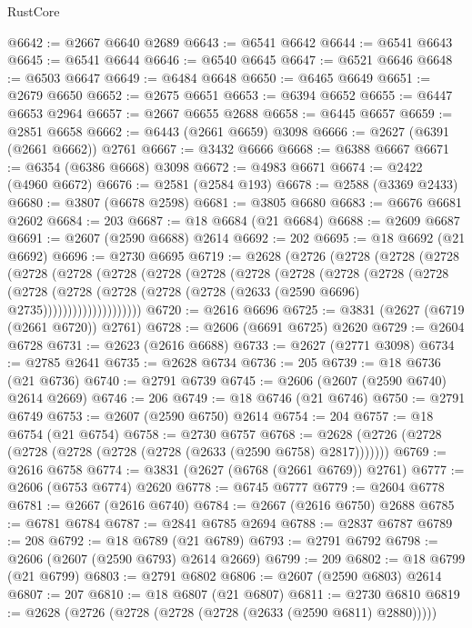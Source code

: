 \begin{lexlean}{RustCore}
\begin{coremodule}
@6642 := @2667 @6640 @2689
@6643 := @6541 @6642
@6644 := @6541 @6643
@6645 := @6541 @6644
@6646 := @6540 @6645
@6647 := @6521 @6646
@6648 := @6503 @6647
@6649 := @6484 @6648
@6650 := @6465 @6649
@6651 := @2679 @6650
@6652 := @2675 @6651
@6653 := @6394 @6652
@6655 := @6447 @6653 @2964
@6657 := @2667 @6655 @2688
@6658 := @6445 @6657
@6659 := @2851 @6658
@6662 := @6443 (@2661 @6659) @3098
@6666 := @2627 (@6391 (@2661 @6662)) @2761
@6667 := @3432 @6666
@6668 := @6388 @6667
@6671 := @6354 (@6386 @6668) @3098
@6672 := @4983 @6671
@6674 := @2422 (@4960 @6672)
@6676 := @2581 (@2584 @193)
@6678 := @2588 (@3369 @2433)
@6680 := @3807 (@6678 @2598)
@6681 := @3805 @6680
@6683 := @6676 @6681 @2602
@6684 := 203
@6687 := @18 @6684 (@21 @6684)
@6688 := @2609 @6687
@6691 := @2607 (@2590 @6688) @2614
@6692 := 202
@6695 := @18 @6692 (@21 @6692)
@6696 := @2730 @6695
@6719 := @2628
    (@2726
      (@2728
        (@2728
          (@2728
            (@2728
              (@2728
                (@2728
                  (@2728
                    (@2728
                      (@2728
                        (@2728
                          (@2728
                            (@2728
                              (@2728
                                (@2728
                                  (@2728
                                    (@2728
                                      (@2728 (@2728 (@2633 (@2590 @6696) @2735))))))))))))))))))))
@6720 := @2616 @6696
@6725 := @3831 (@2627 (@6719 (@2661 @6720)) @2761)
@6728 := @2606 (@6691 @6725) @2620
@6729 := @2604 @6728
@6731 := @2623 (@2616 @6688)
@6733 := @2627 (@2771 @3098)
@6734 := @2785 @2641
@6735 := @2628 @6734
@6736 := 205
@6739 := @18 @6736 (@21 @6736)
@6740 := @2791 @6739
@6745 := @2606 (@2607 (@2590 @6740) @2614 @2669)
@6746 := 206
@6749 := @18 @6746 (@21 @6746)
@6750 := @2791 @6749
@6753 := @2607 (@2590 @6750) @2614
@6754 := 204
@6757 := @18 @6754 (@21 @6754)
@6758 := @2730 @6757
@6768 := @2628 (@2726 (@2728 (@2728 (@2728 (@2728 (@2728 (@2633 (@2590 @6758) @2817)))))))
@6769 := @2616 @6758
@6774 := @3831 (@2627 (@6768 (@2661 @6769)) @2761)
@6777 := @2606 (@6753 @6774) @2620
@6778 := @6745 @6777
@6779 := @2604 @6778
@6781 := @2667 (@2616 @6740)
@6784 := @2667 (@2616 @6750) @2688
@6785 := @6781 @6784
@6787 := @2841 @6785 @2694
@6788 := @2837 @6787
@6789 := 208
@6792 := @18 @6789 (@21 @6789)
@6793 := @2791 @6792
@6798 := @2606 (@2607 (@2590 @6793) @2614 @2669)
@6799 := 209
@6802 := @18 @6799 (@21 @6799)
@6803 := @2791 @6802
@6806 := @2607 (@2590 @6803) @2614
@6807 := 207
@6810 := @18 @6807 (@21 @6807)
@6811 := @2730 @6810
@6819 := @2628 (@2726 (@2728 (@2728 (@2728 (@2633 (@2590 @6811) @2880)))))

\end{coremodule}
\end{lexlean}
